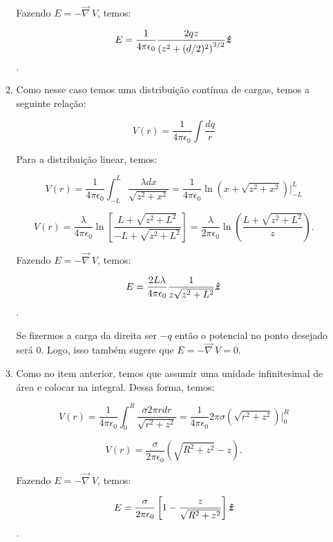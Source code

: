 \documentclass[11pt,a4paper]{article}
\newcommand{\mat}[1]{\mbox{\boldmath{$#1$}}}
\begin{document}
\begin{enumerate}
\begin{enumerate}
Fazendo $E = -\vec{\nabla} \ V$, temos:

$$E = \displaystyle\dfrac{1}{4\pi\epsilon_0} \displaystyle\dfrac{2qz}{\left(z^2 + (d/2)^2\right)^{3/2}} \mat{\hat{z}}$$.

\item

Como nesse caso temos uma distribuição contínua de cargas, temos a seguinte relação:

$$V(r) = \displaystyle\dfrac{1}{4\pi\epsilon_0}\displaystyle\int \displaystyle\dfrac{dq}{r}$$

Para a distribuição linear, temos:

$$V(r) = \displaystyle\dfrac{1}{4\pi\epsilon_0}\displaystyle\int_{-L}^{L} \displaystyle\dfrac{\lambda dx}{\sqrt{z^2 + x^2}} = \displaystyle\dfrac{1}{4\pi\epsilon_0} \ln(x + \sqrt{z^2 + x^2})|_{-L}^{L}$$

$$V(r) = \displaystyle\dfrac{\lambda}{4\pi\epsilon_0} \ln \left[ \displaystyle\dfrac{L + \sqrt{z^2 + L^2}}{-L + \sqrt{z^2 + L^2}}\right] = \displaystyle\dfrac{\lambda}{2\pi\epsilon_0} \ln \left( \displaystyle\dfrac{L + \sqrt{z^2 + L^2}}{z}\right).$$

Fazendo $E = -\vec{\nabla} \ V$, temos:

$$E = \displaystyle\dfrac{2L \lambda}{4\pi\epsilon_0} \displaystyle\dfrac{1}{z\sqrt{z^2 + L^2}} \mat{\hat{z}}$$.

Se fizermos a carga da direita ser $-q$ então o potencial no ponto desejado será $0$. Logo, isso também sugere que $E = -\vec{\nabla} \ V = 0$.

\item 

Como no item anterior, temos que assumir uma unidade infinitesimal de área e colocar na integral. Dessa forma, temos:

$$V(r) = \displaystyle\dfrac{1}{4\pi\epsilon_0}\displaystyle\int_{0}^{R} \displaystyle\dfrac{\sigma 2 \pi r dr}{\sqrt{r^2 + z^2}} = \displaystyle\dfrac{1}{4\pi\epsilon_0} 2 \pi \sigma (\sqrt{r^2 + z^2})|_{0}^{R}$$

$$V(r) = \displaystyle\dfrac{\sigma}{2\pi\epsilon_0} \left( \sqrt{R^2 + z^2} - z\right).$$

Fazendo $E = -\vec{\nabla} \ V$, temos:

$$E = \displaystyle\dfrac{\sigma}{2\pi\epsilon_0} \left[ 1 - \displaystyle\dfrac{z}{\sqrt{R^2 + z^2}}\right]\mat{\hat{z}}$$.

\end{enumerate}



\end{enumerate}
\end{document}
